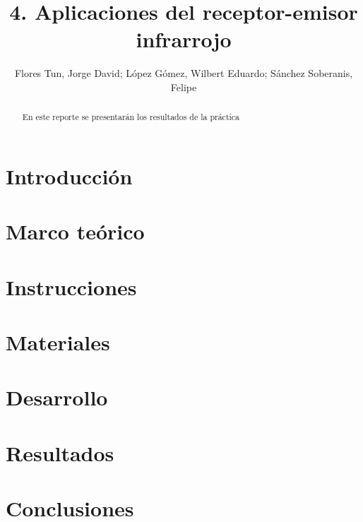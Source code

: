 \documentclass[]{article}
\title{4. Aplicaciones del receptor-emisor infrarrojo}
\author{Flores Tun, Jorge David; López Gómez, Wilbert Eduardo; Sánchez Soberanis, Felipe}
\begin{document}
\maketitle

\begin{abstract}
    En este reporte se presentarán los resultados de la práctica 
\end{abstract}

\section{Introducción}

\section{Marco teórico}

\section{Instrucciones}

\section{Materiales}

\section{Desarrollo}

\section{Resultados}

\section{Conclusiones}


\end{document}
